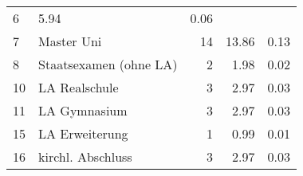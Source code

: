 \begin{longtable}{lXrrr}
       \num{6} &
       \num[round-mode=places,round-precision=2]{5.94} &
         \num[round-mode=places,round-precision=2]{0.06} \\

     7 &
     \multicolumn{1}{X}{ Master Uni   } &


       \num{14} &
       \num[round-mode=places,round-precision=2]{13.86} &
         \num[round-mode=places,round-precision=2]{0.13} \\

     8 &
     \multicolumn{1}{X}{ Staatsexamen (ohne LA)   } &


       \num{2} &
       \num[round-mode=places,round-precision=2]{1.98} &
         \num[round-mode=places,round-precision=2]{0.02} \\

     10 &
     \multicolumn{1}{X}{ LA Realschule   } &


       \num{3} &
       \num[round-mode=places,round-precision=2]{2.97} &
         \num[round-mode=places,round-precision=2]{0.03} \\

     11 &
     \multicolumn{1}{X}{ LA Gymnasium   } &


       \num{3} &
       \num[round-mode=places,round-precision=2]{2.97} &
         \num[round-mode=places,round-precision=2]{0.03} \\

     15 &
     \multicolumn{1}{X}{ LA Erweiterung   } &


       \num{1} &
       \num[round-mode=places,round-precision=2]{0.99} &
         \num[round-mode=places,round-precision=2]{0.01} \\

     16 &
     \multicolumn{1}{X}{ kirchl. Abschluss   } &


       \num{3} &
       \num[round-mode=places,round-precision=2]{2.97} &
         \num[round-mode=places,round-precision=2]{0.03} \\


\end{longtable}
